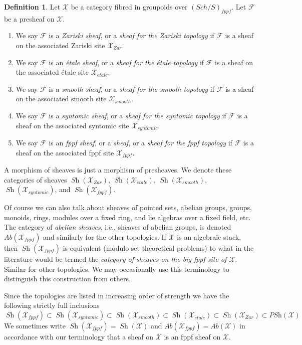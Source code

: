 \documentclass{stacks-project}
\theoremstyle{plain}
\theoremstyle{definition}
\newtheorem{definition}[subsection]{Definition}
\theoremstyle{remark}
\numberwithin{equation}{subsection}
\def\Sch{\mathit{Sch}}
\def\Sh{\mathop{\mathit{Sh}}\nolimits}
\def\etale{{\acute{e}tale}}
\begin{document}
\begin{definition}
\label{definition-sheaves}
Let $\mathcal{X}$ be a category fibred in groupoids over
$(\Sch/S)_{fppf}$. Let $\mathcal{F}$ be a presheaf on $\mathcal{X}$.
\begin{enumerate}
\item We say $\mathcal{F}$ is a {\it Zariski sheaf}, or a
{\it sheaf for the Zariski topology} if $\mathcal{F}$
is a sheaf on the associated Zariski site $\mathcal{X}_{Zar}$.
\item We say $\mathcal{F}$ is an {\it \'etale sheaf}, or a
{\it sheaf for the \'etale topology} if $\mathcal{F}$
is a sheaf on the associated \'etale site $\mathcal{X}_\etale$.
\item We say $\mathcal{F}$ is a {\it smooth sheaf}, or a
{\it sheaf for the smooth topology} if $\mathcal{F}$
is a sheaf on the associated smooth site $\mathcal{X}_{smooth}$.
\item We say $\mathcal{F}$ is a {\it syntomic sheaf}, or a
{\it sheaf for the syntomic topology} if $\mathcal{F}$
is a sheaf on the associated syntomic site $\mathcal{X}_{syntomic}$.
\item We say $\mathcal{F}$ is an {\it fppf sheaf}, or a {\it sheaf},
or a {\it sheaf for the fppf topology} if $\mathcal{F}$
is a sheaf on the associated fppf site $\mathcal{X}_{fppf}$.
\end{enumerate}
A morphism of sheaves is just a morphism of presheaves. We denote
these categories of sheaves
$\Sh(\mathcal{X}_{Zar})$,
$\Sh(\mathcal{X}_\etale)$,
$\Sh(\mathcal{X}_{smooth})$,
$\Sh(\mathcal{X}_{syntomic})$, and
$\Sh(\mathcal{X}_{fppf})$.
\end{definition}

\noindent
Of course we can also talk about sheaves of pointed sets, abelian groups,
groups, monoids, rings, modules over a fixed ring, and lie algebras over
a fixed field, etc. The category of {\it abelian sheaves}, i.e., sheaves
of abelian groups, is denoted $\textit{Ab}(\mathcal{X}_{fppf})$
and similarly for the other topologies. If $\mathcal{X}$ is an algebraic
stack, then $\Sh(\mathcal{X}_{fppf})$ is equivalent (modulo
set theoretical problems) to what in the literature would be termed
the {\it category of sheaves on the big fppf site of $\mathcal{X}$}. Similar
for other topologies. We may occasionally use this terminology to
distinguish this construction from others.

\medskip\noindent
Since the topologies are listed in increasing order of strength we have
the following strictly full inclusions
$$
\Sh(\mathcal{X}_{fppf}) \subset
\Sh(\mathcal{X}_{syntomic}) \subset
\Sh(\mathcal{X}_{smooth}) \subset
\Sh(\mathcal{X}_\etale) \subset
\Sh(\mathcal{X}_{Zar}) \subset \textit{PSh}(\mathcal{X})
$$
We sometimes write
$\Sh(\mathcal{X}_{fppf}) = \Sh(\mathcal{X})$
and
$\textit{Ab}(\mathcal{X}_{fppf}) = \textit{Ab}(\mathcal{X})$
in accordance with our terminology that a sheaf on $\mathcal{X}$
is an fppf sheaf on $\mathcal{X}$.
\end{document}
